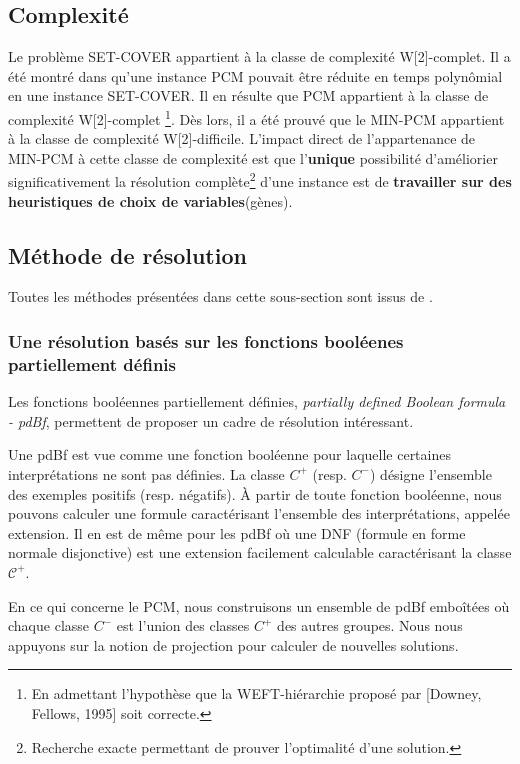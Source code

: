 \subsection{Complexité}
Le problème SET-COVER appartient à la classe de complexité W[2]-complet. Il a été montré dans \cite{Chhel2013} qu'une instance PCM pouvait être réduite en temps polynômial en une instance SET-COVER. Il en résulte que PCM appartient à la classe de complexité W[2]-complet \footnote{En admettant l'hypothèse que la WEFT-hiérarchie proposé par [Downey, Fellows, 1995] soit correcte.}. Dès lors, il a été prouvé que le MIN-PCM appartient à la classe de complexité W[2]-difficile. L'impact direct de l'appartenance de MIN-PCM à cette classe de complexité est que l'\textbf{unique} possibilité d'améliorier significativement la résolution complète\footnote{Recherche exacte permettant de prouver l'optimalité d'une solution.} d'une instance est de \textbf{travailler sur des heuristiques de choix de variables}(gènes). 

\subsection{Méthode de résolution}
Toutes les méthodes présentées dans cette sous-section sont issus de \cite{Chhel2013}.

\subsubsection{Une résolution basés sur les fonctions booléenes partiellement définis}

Les fonctions booléennes partiellement définies, {\em partially
defined Boolean formula - pdBf},  \cite{Iba99} permettent de proposer un
cadre de résolution intéressant.

Une pdBf est vue comme une fonction booléenne pour laquelle  certaines interprétations ne
sont pas définies.
La classe ${C}^{+}$ (resp. ${C}^{-}$)  désigne l'ensemble des exemples positifs
(resp. négatifs).
À partir de toute fonction booléenne, nous pouvons calculer une formule
caractérisant l'ensemble des interprétations, appelée extension. Il en est de
même pour les pdBf où une DNF (formule en forme normale disjonctive) est une
extension facilement calculable caractérisant la classe $\mathcal{C}^+$.

En ce qui concerne le PCM, nous construisons un ensemble de pdBf emboîtées où
chaque classe ${C}^{-}$ est l'union des classes ${C}^{+}$ des autres groupes.
Nous nous appuyons sur la notion de projection pour calculer de nouvelles
solutions.

